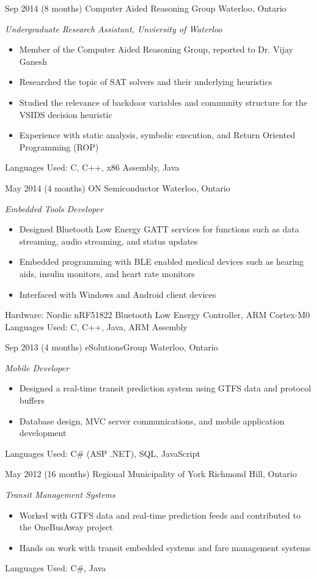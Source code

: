 \documentclass[print]{friggeri-cv} %
\begin{document}
\begin{entrylist}
\entry
{Sep 2014}
{(8 months)}
{Computer Aided Reasoning Group}
{Waterloo, Ontario}
{\emph{Undergraduate Research Assistant, Unviersity of Waterloo}
\begin{itemize}
\item Member of the Computer Aided Reasoning Group, reported to Dr. Vijay Ganesh
\item Researched the topic of SAT solvers and their underlying heuristics
\item Studied the relevance of backdoor variables and community structure for the VSIDS decision heuristic
\item Experience with static analysis, symbolic execution, and Return Oriented Programming (ROP)
\end{itemize}
Languages Used: C, C++, x86 Assembly, Java \\
}

\entry
{May 2014}
{(4 months)}
{ON Semiconductor}
{Waterloo, Ontario}
{\emph{Embedded Tools Developer}
\begin{itemize}
\item Designed Bluetooth Low Energy GATT services for functions such as data streaming, audio streaming, and status updates
\item Embedded programming with BLE enabled medical devices such as hearing aids, insulin monitors, and heart rate monitors
\item Interfaced with Windows and Android client devices
\end{itemize}
Hardware: Nordic nRF51822 Bluetooth Low Energy Controller, ARM Cortex-M0 \\
Languages Used: C, C++, Java, ARM Assembly \\
}

\entry
{Sep 2013}
{(4 months)}
{eSolutionsGroup}
{Waterloo, Ontario}
{\emph{Mobile Developer}
\begin{itemize}
\item Designed a real-time transit prediction system using GTFS data and protocol buffers
\item Database design, MVC server communications, and mobile application development
\end{itemize}
Languages Used: C\# (ASP .NET), SQL, JavaScript \\
}

\entry
{May 2012}
{(16 months)}
{Regional Municipality of York}
{Richmond Hill, Ontario}
{\emph{Transit Management Systems}
\begin{itemize}
\item Worked with GTFS data and real-time prediction feeds and contributed to the OneBusAway project
\item Hands on work with transit embedded systems and fare management systems
\end{itemize}
Languages Used: C\#, Java \\
}

\end{entrylist}
\end{document}
